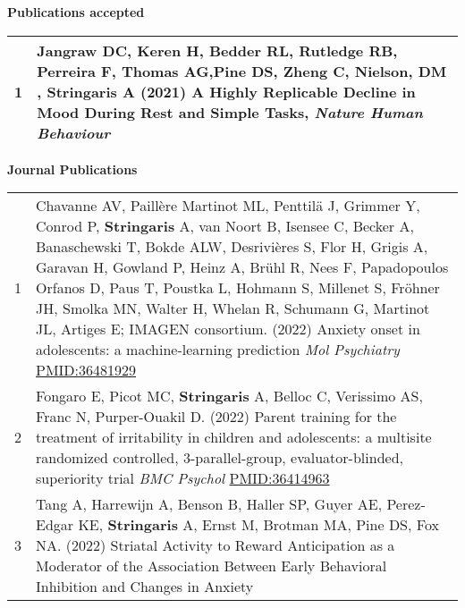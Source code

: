 \documentclass[
]{article}
\begin{document}
\textbf{Publications accepted}

\begin{longtable}[]{@{}rl@{}}
\toprule
\endhead
1 & Jangraw DC, Keren H, Bedder RL, Rutledge RB, Perreira F, Thomas
AG,Pine DS, Zheng C, Nielson, DM , \textbf{Stringaris} A (2021) A Highly
Replicable Decline in Mood During Rest and Simple Tasks, \emph{Nature
Human Behaviour}\tabularnewline
\bottomrule
\end{longtable}

\textbf{Journal Publications}

\begin{longtable}[]{@{}ll@{}}
\toprule
\endhead
\begin{minipage}[t]{0.01\columnwidth}\raggedright
1\strut
\end{minipage} & \begin{minipage}[t]{0.94\columnwidth}\raggedright
Chavanne AV, Paillère Martinot ML, Penttilä J, Grimmer Y, Conrod P,
\textbf{Stringaris} A, van Noort B, Isensee C, Becker A, Banaschewski T,
Bokde ALW, Desrivières S, Flor H, Grigis A, Garavan H, Gowland P, Heinz
A, Brühl R, Nees F, Papadopoulos Orfanos D, Paus T, Poustka L, Hohmann
S, Millenet S, Fröhner JH, Smolka MN, Walter H, Whelan R, Schumann G,
Martinot JL, Artiges E; IMAGEN consortium. (2022) Anxiety onset in
adolescents: a machine-learning prediction \emph{Mol Psychiatry}
\url{PMID:36481929}\strut
\end{minipage}\tabularnewline
\begin{minipage}[t]{0.01\columnwidth}\raggedright
2\strut
\end{minipage} & \begin{minipage}[t]{0.94\columnwidth}\raggedright
Fongaro E, Picot MC, \textbf{Stringaris} A, Belloc C, Verissimo AS,
Franc N, Purper-Ouakil D. (2022) Parent training for the treatment of
irritability in children and adolescents: a multisite randomized
controlled, 3-parallel-group, evaluator-blinded, superiority trial
\emph{BMC Psychol} \url{PMID:36414963}\strut
\end{minipage}\tabularnewline
\begin{minipage}[t]{0.01\columnwidth}\raggedright
3\strut
\end{minipage} & \begin{minipage}[t]{0.94\columnwidth}\raggedright
Tang A, Harrewijn A, Benson B, Haller SP, Guyer AE, Perez-Edgar KE,
\textbf{Stringaris} A, Ernst M, Brotman MA, Pine DS, Fox NA. (2022)
Striatal Activity to Reward Anticipation as a Moderator of the
Association Between Early Behavioral Inhibition and Changes in Anxiety

\end{minipage}
\end{longtable}
\end{document}
